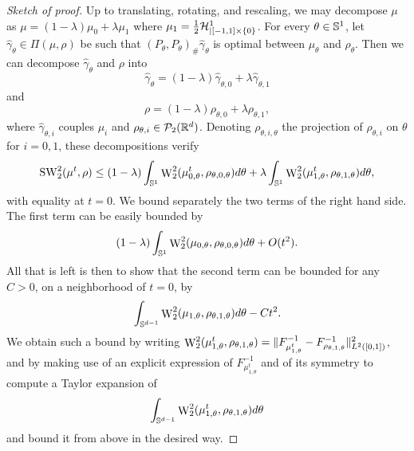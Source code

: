 \begin{proof}[Sketch of proof]
    Up to translating, rotating, and rescaling, we may decompose $\mu$ as $\mu = (1-\lambda)\mu_0 + \lambda \mu_1$ where $\mu_1 = \frac{1}{2}\mathcal{H}^1_{|[-1,1]\times\{0\}}$. For every $\theta \in \mathbb S^1$, let $\hat{\gamma}_\theta \in \Pi(\mu,\rho)$ be such that $(P_\theta,P_\theta)_\#\hat{\gamma}_\theta$ is optimal between $\mu_\theta$ and $\rho_\theta$. Then we can decompose $\hat{\gamma}_\theta$ and $\rho$ into 
    \begin{equation}\hat{\gamma}_\theta = (1-\lambda)\hat{\gamma}_{\theta,0} + \lambda \hat{\gamma}_{\theta,1}\end{equation} 
    and 
    \begin{equation}\rho = (1-\lambda)\rho_{\theta,0} + \lambda \rho_{\theta,1},\end{equation}
    where $\hat{\gamma}_{\theta,i}$ couples $\mu_i$ and $\rho_{\theta,i} \in \mathcal{P}_2(\mathbb R^d)$. Denoting $\rho_{\theta,i,\theta}$ the projection of $\rho_{\theta,i}$ on  $\theta$ for $i=0,1$, these decompositions verify 
    \begin{equation}\mathop{\mathrm{SW}}\nolimits^2_2(\mu^t, \rho) \leq (1-\lambda) \int_{\mathbb S^1} \mathop{\mathrm{W}}\nolimits^2_2(\mu_{0,\theta}^t, \rho_{\theta,0,\theta}) d\theta + \lambda \int_{\mathbb S^1} \mathop{\mathrm{W}}\nolimits^2_2(\mu_{1,\theta}^t, \rho_{\theta,1,\theta}) d\theta,\end{equation}
    with equality at $t = 0$. We bound separately the two terms of the right hand side. The first term can be easily bounded by 
    \begin{equation}(1-\lambda) \int_{\mathbb S^1} \mathop{\mathrm{W}}\nolimits^2_2(\mu_{0,\theta}, \rho_{\theta,0,\theta}) d\theta + O(t^2).\end{equation}
    All that is left is then to show that the second term can be bounded for any $C > 0$, on a neighborhood of $t = 0$, by 
    \begin{equation}\int_{\mathbb S^{d-1}} \mathop{\mathrm{W}}\nolimits^2_2(\mu_{1,\theta}, \rho_{\theta,1,\theta}) d\theta - Ct^2.\end{equation} 
    We obtain such a bound by writing $\mathop{\mathrm{W}}\nolimits^2_2(\mu^t_{1,\theta}, \rho_{\theta,1,\theta})=\|F^{-1}_{\mu^t_{1,\theta}} - F^{-1}_{\rho_{\theta,1,\theta}}\|^2_{L^2([0,1])}$, and by making use of an explicit expression of $F^{-1}_{\mu^t_{1,\theta}}$ and of its symmetry to compute a Taylor expansion of 
    \begin{equation}\int_{\mathbb S^{d-1}} \mathop{\mathrm{W}}\nolimits^2_2(\mu^t_{1,\theta}, \rho_{\theta,1,\theta}) d\theta\end{equation} 
    and bound it from above in the desired way. 
\end{proof}

